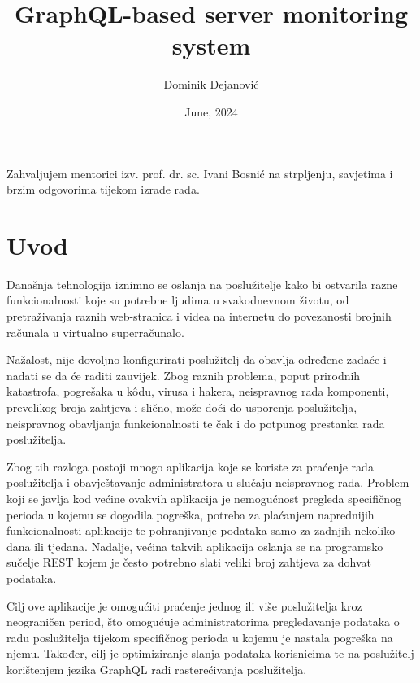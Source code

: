 \documentclass[zavrsnirad]{fer}
\title{GraphQL-based server monitoring system}
\author{Dominik Dejanović}
\date{June, 2024}
\begin{document}

\begin{zahvale}
Zahvaljujem mentorici izv. prof. dr. sc. Ivani Bosnić na strpljenju, savjetima i brzim odgovorima tijekom izrade rada.
\end{zahvale}


\mainmatter


\tableofcontents


\chapter{Uvod}
\label{pog:uvod}
Današnja tehnologija iznimno se oslanja na poslužitelje kako bi ostvarila razne funkcionalnosti koje su potrebne ljudima u svakodnevnom životu, od pretraživanja raznih web-stranica i videa na internetu do povezanosti brojnih računala u virtualno superračunalo. 

Nažalost, nije dovoljno konfigurirati poslužitelj da obavlja određene zadaće i nadati se da će raditi zauvijek. Zbog raznih problema, poput prirodnih katastrofa, pogrešaka u kôdu, virusa i hakera, neispravnog rada komponenti, prevelikog broja zahtjeva i slično, može doći do usporenja poslužitelja, neispravnog obavljanja funkcionalnosti te čak i do potpunog prestanka rada poslužitelja.

Zbog tih razloga postoji mnogo aplikacija koje se koriste za praćenje rada poslužitelja i obavještavanje administratora u slučaju neispravnog rada. Problem koji se javlja kod većine ovakvih aplikacija je nemogućnost pregleda specifičnog perioda u kojemu se dogodila pogreška, potreba za plaćanjem naprednijih funkcionalnosti aplikacije te pohranjivanje podataka samo za zadnjih nekoliko dana ili tjedana. Nadalje, većina takvih aplikacija oslanja se na programsko sučelje REST kojem je često potrebno slati veliki broj zahtjeva za dohvat podataka.

Cilj ove aplikacije je omogućiti praćenje jednog ili više poslužitelja kroz neograničen period, što omogućuje administratorima pregledavanje podataka o radu poslužitelja tijekom specifičnog perioda u kojemu je nastala pogreška na njemu. Također, cilj je optimiziranje slanja podataka korisnicima te na poslužitelj korištenjem jezika GraphQL radi rasterećivanja poslužitelja.
\end{document}
